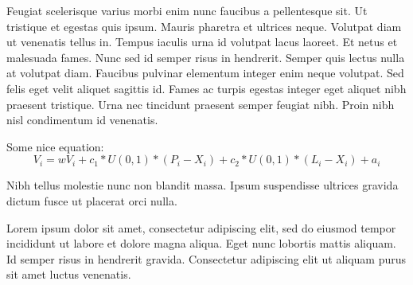 {
    Feugiat scelerisque varius morbi enim nunc faucibus a pellentesque sit. Ut tristique et egestas quis ipsum. Mauris pharetra et ultrices neque. Volutpat diam ut venenatis tellus in. Tempus iaculis urna id volutpat lacus laoreet. Et netus et malesuada fames. Nunc sed id semper risus in hendrerit. Semper quis lectus nulla at volutpat diam. Faucibus pulvinar elementum integer enim neque volutpat. Sed felis eget velit aliquet sagittis id. Fames ac turpis egestas integer eget aliquet nibh praesent tristique. Urna nec tincidunt praesent semper feugiat nibh. Proin nibh nisl condimentum id venenatis.
    
    \vspace{5pt}
    Some nice equation:
    \vspace{5pt}
    \begin{equation} 
        V_{i} = wV_{i} + c_{1} * U(0,1) * (P_{i} - X_{i}) + c_{2} * U(0,1) * (L_{i} - X_{i}) + a_{i} \label{eqn:velocityChargedUpdate} 
    \end{equation} 
}

{
    Nibh tellus molestie nunc non blandit massa. Ipsum suspendisse ultrices gravida dictum fusce ut placerat orci nulla.\\
    
    
}

{
\begin{multicols*}{2}
{
    Lorem ipsum dolor sit amet, consectetur adipiscing elit, sed do eiusmod tempor incididunt ut labore et dolore magna aliqua. Eget nunc lobortis mattis aliquam. Id semper risus in hendrerit gravida. Consectetur adipiscing elit ut aliquam purus sit amet luctus venenatis. 
}
{
}
\end{multicols*}
}